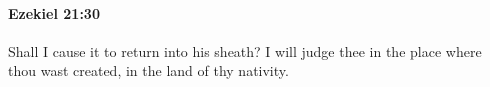 
		\paragraph{Ezekiel 21:30} %
			\label{EZEKIEL-21-30}

			Shall I cause it to return into his sheath? I will judge thee in the place where thou wast created, in the land of thy nativity.



